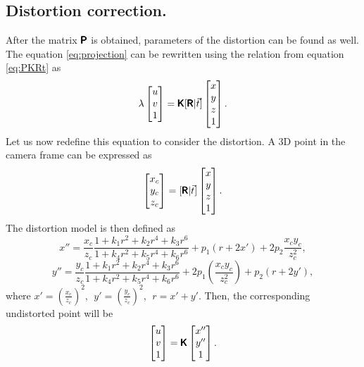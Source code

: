 \subsection{Distortion correction.}
After the matrix $\pmb{\mathsf{P}}$ is obtained, parameters of the distortion can be found as well.
The equation \eqref{eq:projection} can be rewritten using the relation from equation \eqref{eq:PKRt} as
\begin{equation}
    \label{eq:dist_start}
    \lambda \begin{bmatrix} 
        u \\ v \\ 1 \end{bmatrix} = \pmb{\mathsf{K}} [\pmb{\mathsf{R}} | \vec{t}] \begin{bmatrix} x \\ y \\ z \\ 1
    \end{bmatrix}.
\end{equation}
Let us now redefine this equation to consider the distortion. A 3D point in the camera frame can be expressed as 
\begin{equation}
    \label{eq:dist_2}
    \begin{bmatrix} x_c \\ y_c \\ z_c \end{bmatrix}
     = [\pmb{\mathsf{R}} | \vec{t}] \begin{bmatrix} x \\ y \\ z \\ 1
    \end{bmatrix}.
\end{equation}
The distortion model is then defined as 
\begin{equation}
    \label{eq:dist_3}
    x'' = \frac{x_c}{z_c} \frac{1 + k_1r^2 + k_2r^4 + k_3r^6}{1 + k_4r^2 + k_5r^4 + k_6r^6} + p_1(r + 2x') + 2p_2\frac{x_c y_c}{z^2_c},
\end{equation}
\begin{equation}
    \label{eq:dist_4}
    y'' = \frac{y_c}{z_c} \frac{1 + k_1r^2 + k_2r^4 + k_3r^6}{1 + k_4r^2 + k_5r^4 + k_6r^6} + 2p_1(\frac{x_c y_c}{z_c^2}) + p_2(r + 2y'),
\end{equation}
where $x' = (\frac{x_c}{z_c})^2$, $\;y' = (\frac{y_c}{z_c})^2$, $\;r = x' + y'$. Then, the corresponding undistorted point will be
\begin{equation}
    \label{eq:dist_end}
    \begin{bmatrix} u \\ v \\ 1 \end{bmatrix} = \pmb{\mathsf{K}} \begin{bmatrix} x'' \\ y'' \\ 1 \end{bmatrix}.
\end{equation}

